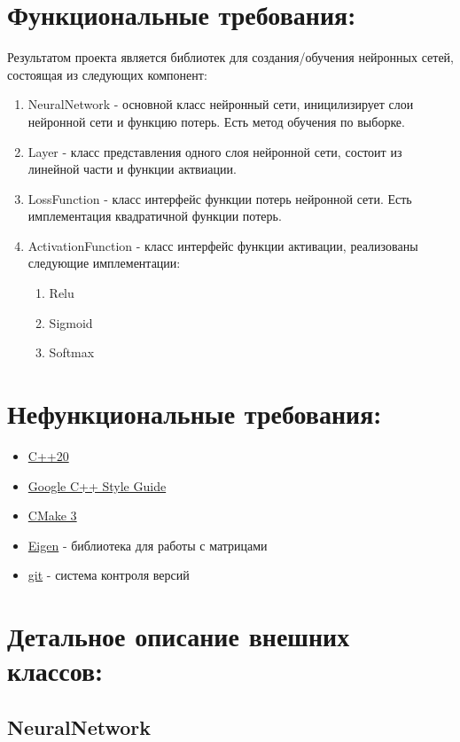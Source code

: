 \documentclass{article}
\begin{document}
\section{Функциональные требования:}
Результатом проекта является библиотек для создания/обучения нейронных сетей, состоящая
из следующих компонент:
\begin{enumerate}
    \item NeuralNetwork - основной класс нейронный сети, иницилизирует слои нейронной сети и функцию потерь. Есть метод обучения по выборке.
    \item Layer - класс представления одного слоя нейронной сети, состоит из линейной части и функции актвиации.
    \item LossFunction - класс интерфейс функции потерь нейронной сети. Есть имплементация квадратичной функции потерь.
    \item ActivationFunction - класс интерфейс функции активации, реализованы следующие имплементации:
    \begin{enumerate}[label=\alph*]
        \item Relu
        \item Sigmoid
        \item Softmax
    \end{enumerate}
\end{enumerate}


\section{Нефункциональные требования:}

\begin{itemize}
    \item \href{https://en.cppreference.com/w/cpp/20}{C++20}
    \item \href{https://google.github.io/styleguide/cppguide.html}{Google C++ Style Guide}
    \item \href{https://cmake.org/}{CMake 3}
    \item \href{https://eigen.tuxfamily.org/}{Eigen} - библиотека для работы с матрицами
    \item \href{https://git-scm.com/}{git} - система контроля версий
\end{itemize}

\section{Детальное описание внешних классов:}
\subsection{NeuralNetwork}
\end{document}
